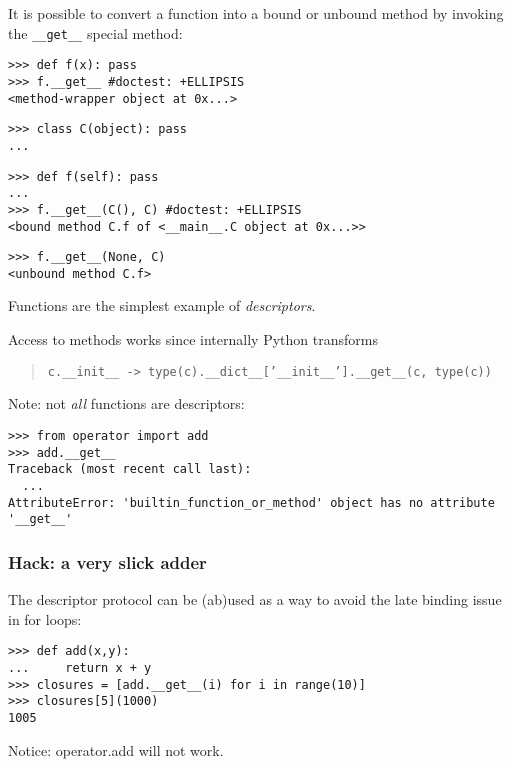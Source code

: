 \documentclass[10pt,a4paper,english]{article}
\begin{document}
It is possible to convert a function into a bound or unbound method
by invoking the \texttt{{\_}{\_}get{\_}{\_}} special method:
\begin{verbatim}>>> def f(x): pass
>>> f.__get__ #doctest: +ELLIPSIS
<method-wrapper object at 0x...>\end{verbatim}
\begin{verbatim}>>> class C(object): pass
...\end{verbatim}
\begin{verbatim}>>> def f(self): pass
...
>>> f.__get__(C(), C) #doctest: +ELLIPSIS
<bound method C.f of <__main__.C object at 0x...>>\end{verbatim}
\begin{verbatim}>>> f.__get__(None, C)
<unbound method C.f>\end{verbatim}

Functions are the simplest example of \emph{descriptors}.

Access to methods works since internally Python transforms
\begin{quote}

\texttt{c.{\_}{\_}init{\_}{\_} -> type(c).{\_}{\_}dict{\_}{\_}{[}'{\_}{\_}init{\_}{\_}'].{\_}{\_}get{\_}{\_}(c, type(c))}
\end{quote}

Note: not \emph{all} functions are descriptors:
\begin{verbatim}>>> from operator import add
>>> add.__get__
Traceback (most recent call last):
  ...
AttributeError: 'builtin_function_or_method' object has no attribute '__get__'\end{verbatim}



\hypertarget{hack-a-very-slick-adder}{}
\subsubsection*{Hack: a very slick adder}

The descriptor protocol can be (ab)used as a way to avoid the late binding
issue in for loops:
\begin{verbatim}>>> def add(x,y):
...     return x + y
>>> closures = [add.__get__(i) for i in range(10)]
>>> closures[5](1000)
1005\end{verbatim}

Notice: operator.add will not work.
\end{document}
